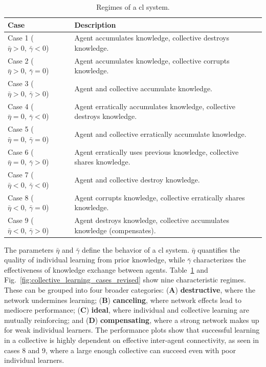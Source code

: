 \documentclass[12pt]{article}
\begin{document}
\begin{table}[t!]
	\centering
	\caption{\label{tab:cl_regimes_revised} Regimes of a \ac{cl} system.}
	\begin{tabular}{|l|p{11cm}|}
		\hline
		\textbf{Case} & \textbf{Description}\\
		\hline
		Case 1 ($\bar{\eta} >0,~\bar{\gamma}<0$) & Agent accumulates knowledge, collective destroys knowledge. \\
		Case 2 ($\bar{\eta} >0,~\bar{\gamma}=0$) & Agent accumulates knowledge, collective corrupts knowledge.\\
		Case 3 ($\bar{\eta} >0,~\bar{\gamma}>0$) & Agent and collective accumulate knowledge.\\
		Case 4 ($\bar{\eta} =0,~\bar{\gamma}<0$) & Agent erratically accumulates knowledge, collective destroys knowledge.\\
		Case 5 ($\bar{\eta} =0,~\bar{\gamma}=0$) & Agent and collective erratically accumulate knowledge.\\
		Case 6 ($\bar{\eta} =0,~\bar{\gamma}>0$) & Agent erratically uses previous knowledge, collective shares knowledge.\\
		Case 7 ($\bar{\eta} <0,~\bar{\gamma}<0$) & Agent and collective destroy knowledge.\\
		Case 8 ($\bar{\eta} <0,~\bar{\gamma}=0$) & Agent corrupts knowledge, collective erratically shares knowledge.\\
		Case 9 ($\bar{\eta} <0,~\bar{\gamma}>0$) & Agent destroys knowledge, collective accumulates knowledge (compensates).\\
		\hline	
	\end{tabular}
\end{table}

The parameters $\bar{\eta}$ and $\bar{\gamma}$ define the behavior of a \ac{cl} system. $\bar{\eta}$ quantifies the quality of individual learning from prior knowledge, while $\bar{\gamma}$ characterizes the effectiveness of knowledge exchange between agents. Table~\ref{tab:cl_regimes_revised} and Fig.~\ref{fig:collective_learning_cases_revised} show nine characteristic regimes. These can be grouped into four broader categories: (\textbf{A}) \textbf{destructive}, where the network undermines learning; (\textbf{B}) \textbf{canceling}, where network effects lead to mediocre performance; (\textbf{C}) \textbf{ideal}, where individual and collective learning are mutually reinforcing; and (\textbf{D}) \textbf{compensating}, where a strong network makes up for weak individual learners. The performance plots show that successful learning in a collective is highly dependent on effective inter-agent connectivity, as seen in cases 8 and 9, where a large enough collective can succeed even with poor individual learners.
\end{document}
